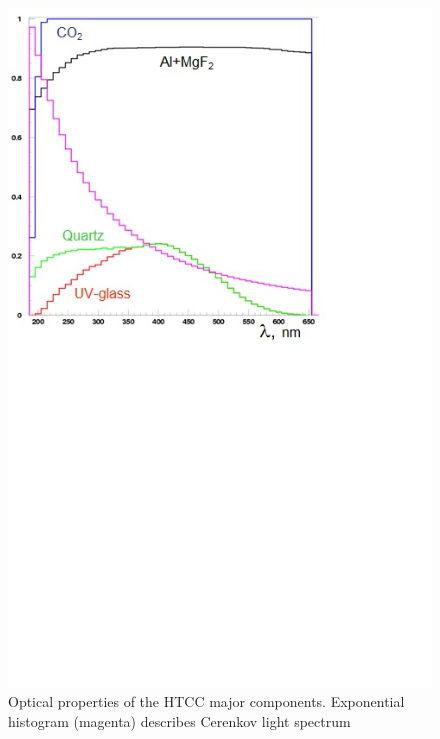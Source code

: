 \begin{figure}[!ht]
    \centering
    \includegraphics[width=1.0\linewidth,trim={0.0cm 10.7cm 3.7cm 0.1cm},clip]{images/PROPERTIES.jpg}
    \caption{Optical properties of the HTCC major components. Exponential histogram (magenta) describes Cerenkov light spectrum}
    \label{fig:PROPERTIES}
\end{figure}

